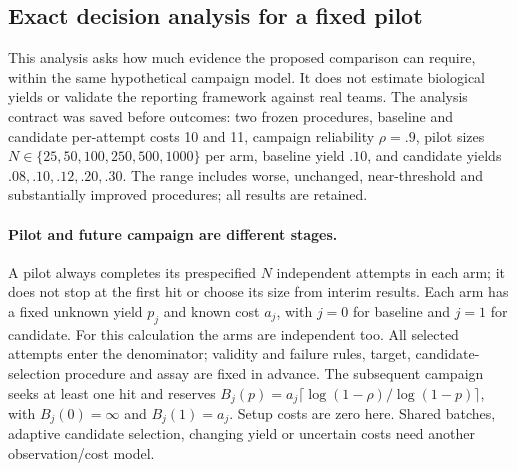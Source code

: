 \subsection{Exact decision analysis for a fixed pilot}
\label{sec:pilot_analysis}
\label{app:pilot}
This analysis asks how much evidence the proposed comparison can require, within the same hypothetical campaign model. It does not estimate biological yields or validate the reporting framework against real teams. The analysis contract was saved before outcomes: two frozen procedures, baseline and candidate per-attempt costs 10 and 11, campaign reliability $\rho=.9$, pilot sizes $N\in\{25,50,100,250,500,1000\}$ per arm, baseline yield $.10$, and candidate yields $.08,.10,.12,.20,.30$. The range includes worse, unchanged, near-threshold and substantially improved procedures; all results are retained.

\paragraph{Pilot and future campaign are different stages.}
A pilot always completes its prespecified $N$ independent attempts in each arm; it does not stop at the first hit or choose its size from interim results. Each arm has a fixed unknown yield $p_j$ and known cost $a_j$, with $j=0$ for baseline and $j=1$ for candidate. For this calculation the arms are independent too. All selected attempts enter the denominator; validity and failure rules, target, candidate-selection procedure and assay are fixed in advance. The subsequent campaign seeks at least one hit and reserves $B_j(p)=a_j\lceil\log(1-\rho)/\log(1-p)\rceil$, with $B_j(0)=\infty$ and $B_j(1)=a_j$. Setup costs are zero here. Shared batches, adaptive candidate selection, changing yield or uncertain costs need another observation/cost model.

